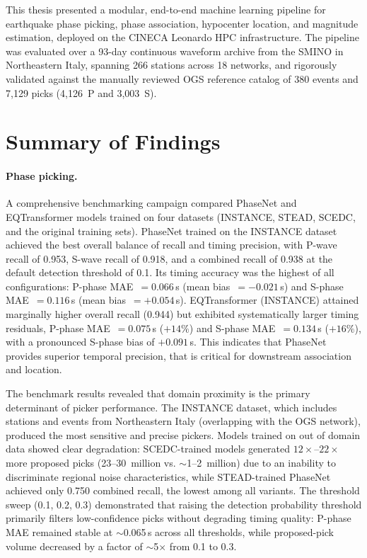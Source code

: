 \label{chap:Conclusion}

This thesis presented a modular, end-to-end machine learning pipeline for
earthquake phase picking, phase association, hypocenter location, and magnitude
estimation, deployed on the CINECA Leonardo \ac{HPC} infrastructure. The
pipeline was evaluated over a 93-day continuous waveform archive from the
\ac{SMINO} in Northeastern Italy, spanning 266 stations across 18 networks, and
rigorously validated against the manually reviewed OGS reference catalog of 380
events and 7,129 picks (4,126~P and 3,003~S).

\section{Summary of Findings}

\paragraph{Phase picking.}
A comprehensive benchmarking campaign compared PhaseNet and EQTransformer
models trained on four datasets (INSTANCE, STEAD, SCEDC, and the original
training sets). PhaseNet trained on the INSTANCE dataset achieved the best
overall balance of recall and timing precision, with P-wave recall of 0.953,
S-wave recall of 0.918, and a combined recall of 0.938 at the default
detection threshold of 0.1. Its timing accuracy was the highest of all
configurations: P-phase MAE~$=0.066$\,s (mean bias~$=-0.021$\,s) and S-phase
MAE~$= 0.116$\,s (mean bias~$=+0.054$\,s). EQTransformer (INSTANCE) attained
marginally higher overall recall (0.944) but exhibited systematically larger
timing residuals, P-phase MAE~$=0.075$\,s ($+14\%$) and S-phase MAE~$=0.134$\,s
($+16\%$), with a pronounced S-phase bias of $+0.091$\,s. This indicates that
PhaseNet provides superior temporal precision, that is critical for downstream
association and location.

The benchmark results revealed that domain proximity is the primary determinant
of picker performance. The INSTANCE dataset, which includes stations and events
from Northeastern Italy (overlapping with the OGS network), produced the most
sensitive and precise pickers. Models trained on out of domain data showed
clear degradation: SCEDC-trained models generated $12\times$--$22\times$ more
proposed picks (23--30~million vs. $\sim$1--2~million) due to an inability to
discriminate regional noise characteristics, while STEAD-trained PhaseNet
achieved only 0.750 combined recall, the lowest among all variants. The
threshold sweep (0.1, 0.2, 0.3) demonstrated that raising the detection
probability threshold primarily filters low-confidence picks without degrading
timing quality: P-phase MAE remained stable at $\sim$0.065\,s across all
thresholds, while proposed-pick volume decreased by a factor of $\sim$5$\times$
from 0.1 to 0.3.

